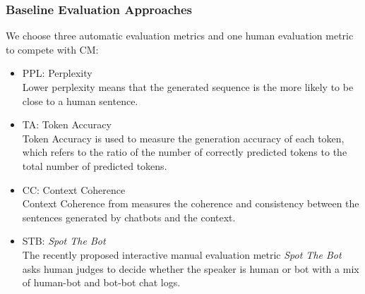 \subsubsection*{Baseline Evaluation Approaches}
We choose three automatic evaluation metrics and one human evaluation 
metric to compete with CM: 
\begin{itemize}
\item PPL: Perplexity \\
Lower perplexity means that the generated sequence is 
the more likely to be close to a human sentence.
\item TA: Token Accuracy \\
Token Accuracy is used to measure the generation accuracy 
of each token, which refers to the ratio of the number of 
correctly predicted tokens to the total number of predicted tokens.
\item CC: Context Coherence \\
 Context Coherence from \citet{pang-etal-2020-towards} measures the coherence and 
consistency between the sentences generated by chatbots and the 
context.
\item STB: \textit{Spot The Bot}  \\
The recently proposed interactive manual evaluation metric \textit{Spot The Bot} \citep{deriu-etal-2020-spot} asks human judges to decide whether the speaker is human or bot with a mix of human-bot and bot-bot chat logs.   

\end{itemize}



